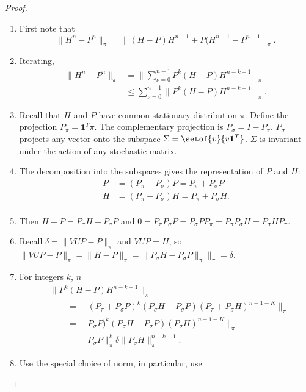 \documentclass[12pt]{article}
\begin{document}
\begin{proof}
  \begin{enumerate}
  \item First note that
    \[
      \| H^n - P^n \|_{\pi} = \|(H-P)H^{n-1}+P(H^{n-1} -P^{n-1}\|_{\pi}.
    \]
  \item Iterating,
    \begin{align*}
      \| H^n - P^n \|_{\pi} &= \| \sum_{\nu=0}^{n-1}
      P^k(H-P)H^{n-k-1}\|_{\pi} \\
      & \le \sum_{\nu=0}^{n-1} \|  P^k(H-P)H^{n-k-1}\|_{\pi}.
    \end{align*}
  \item Recall that $H$ and $P$ have common stationary distribution
    $\pi$.  Define the projection $P_{\pi} = \mathbf{1}^T \pi$.  The
    complementary projection is $P_{\sigma} = I - P_{\pi}$.
    $P_{\sigma}$ projects any vector onto the subspace $\Sigma =
    \setof{v}{v \mathbf{1}^T}$.  $\Sigma$ is invariant under the
    action of any stochastic matrix.
  \item The decomposition into the subspaces gives the representation
    of $P$ and $H$:
    \begin{align*}
      P &= (P_{\pi} + P_{\sigma}) P = P_{\pi} + P_{\sigma}P \\
      H &= (P_{\pi} + P_{\sigma}) H = P_{\pi} + P_{\sigma}H. \\
    \end{align*}
  \item Then $H - P = P_{\sigma}H - P_{\sigma}P$ and $0 = P_{\pi}
    P_{\sigma} P = P_{\sigma} P P_{\pi} = P_{\pi}
    P_{\sigma} H = P_{\sigma} H P_{\pi}$.
  \item Recall $ \delta = \| VUP - P \|_{\pi}$ and $VUP = H$, so $\|
    VUP - P \|_{\pi} = \| H - P \|_{\pi} = \|P_{\sigma}H -
    P_{\sigma}P\|_{\pi}\|_{\pi} = \delta$.
  \item For integers $k$, $n$
    \begin{align*}
      & \| P^k(H-P)H^{n-k-1} \|_{\pi} \\
      & \qquad = \|(P_{\pi}+P_{\sigma}P)^k(P_{\sigma}H-P_{\sigma}P)
        (P_{\pi}+P_{\sigma}H)^{n-1-K}\|_{\pi} \\
      & \qquad = \|P_{\sigma}P)^k(P_{\sigma}H-P_{\sigma}P)
        (P_{\sigma}H)^{n-1-K}\|_{\pi} \\
      & \qquad = \| P_{\sigma} P \|_{\pi}^k \delta \|P_{\sigma}H\|_{\pi}^{n-k-1}.
    \end{align*}
  \item  Use the special choice of norm, in particular, use

\end{enumerate}
\end{proof}
\end{document}
